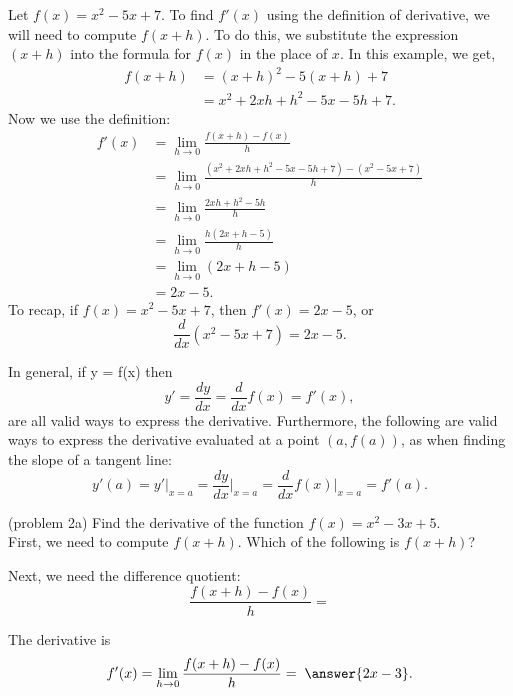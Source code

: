 \documentclass{ximera}
\begin{document}
\begin{example}[example 2]
Let $f(x) = x^2 - 5x + 7$.  To find $f'(x)$ using the definition of derivative, we will need to compute $f(x+h)$.
To do this, we substitute the expression $(x+h)$ into the formula for $f(x)$ in the place of $x$.  
In this example, we get,
\begin{align*}
f(x+h) &= (x+h)^2 - 5(x+h) + 7 \\
       &= x^2 + 2xh + h^2 - 5x -5h + 7.			
\end{align*}
Now we use the definition:			
\begin{align*}
f'(x) &= \lim_{h \to 0} \frac{f(x+h)-f(x)}{h} \\[5pt] 
&= \lim_{h \to 0} \frac{(x^2 + 2xh + h^2 - 5x - 5h +7)- (x^2 - 5x + 7)}{h}\\[5pt]
&= \lim_{h \to 0} \frac{ 2xh + h^2 - 5h }{h} \\[5pt]
&= \lim_{h \to 0} \frac{ h(2x + h -5)}{h}\\[5pt]
&= \lim_{h \to 0} (2x + h -5)\\
&= 2x-5.
\end{align*}
To recap, if $f(x) = x^2 - 5x + 7$, then $f'(x) =2x-5$,
or
\[
\frac{d}{dx} (x^2 - 5x + 7) = 2x-5.
\]
\end{example}



In general, if y = f(x) then
\[
y' = \frac{dy}{dx} = \frac{d}{dx} f(x) = f'(x),
\]
are all valid ways to express the derivative.
Furthermore, the following are valid ways to express the derivative evaluated at a point $(a, f(a))$, as when finding the slope of a tangent line:
\[
y'(a) = y' \big|_{x=a} = \frac{dy}{dx}\Big|_{x=a} = \frac{d}{dx} f(x)\Big|_{x=a} = f'(a).
\]


\begin{problem}(problem 2a)
Find the derivative of the function $f(x) = x^2 - 3x + 5$.\\
First, we need to compute $f(x + h)$. Which of the following is $f(x+h)$?
\begin{multipleChoice}
\end{multipleChoice}
Next, we need the difference quotient:
\[
\frac{f(x+h) - f(x)}{h} = 
\]
\begin{multipleChoice}
\end{multipleChoice}

The derivative is
\[
f'(x) = \lim_{h \to 0} \frac{f(x+h) - f(x)}{h} = \; \answer{2x-3}.
\]
\end{problem} 
\end{document}
